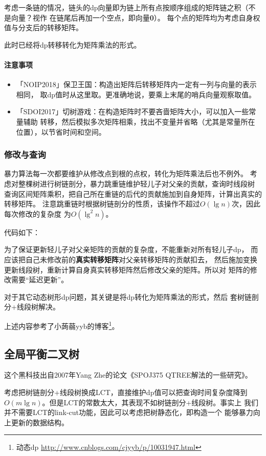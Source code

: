 考虑一条链的情况，链头的dp向量即为链上所有点按顺序组成的矩阵链之积（不是向量？视作
在链尾后再加一个空点，即向量{\bfseries 0}）。
每个点的矩阵均为考虑自身权值与分支后的转移矩阵。

此时已经将dp转移转化为矩阵乘法的形式。

\paragraph{注意事项}
\begin{itemize}
    \item 「NOIP2018」保卫王国：构造出矩阵后转移矩阵内一定有一列与向量的表示相同，
    取dp值时从这里取。更准确地说，要乘上末尾的哨兵向量观察取值。
    \item 「SDOI2017」切树游戏：在构造矩阵时不要吝啬矩阵大小，可以加入一些常量辅助
    转移，然后模拟多次矩阵相乘，找出不变量并省略（尤其是常量所在位置），以节省时间和空间。
\end{itemize}

\subsubsection{修改与查询}
暴力算法每一次都要维护从修改点到根的点权，转化为矩阵乘法后也不例外。
考虑对整棵树进行树链剖分，暴力跳重链维护轻儿子对父亲的贡献，查询时线段树
查询区间矩阵乘积，把自己所在重链的后代的贡献施加到自身矩阵，计算出真实的转移矩阵。
注意跳重链时根据树链剖分的性质，该操作不超过$O(\lg n)$次，因此每次修改的复杂度
为$O(\lg^2 n)$。

代码如下：


为了保证更新轻儿子对父亲矩阵的贡献的复杂度，不能重新对所有轻儿子dp，
而应该把自己未修改前的{\bfseries 真实转移矩阵}对父亲转移矩阵的贡献扣去，
然后施加变换更新线段树，重新计算自身真实转移矩阵然后修改父亲的矩阵。所以对
矩阵的修改需要``延迟更新''。

对于其它动态树形dp问题，其关键是将dp转化为矩阵乘法的形式，然后
套树链剖分+线段树解决。

上述内容参考了小蒟蒻yyb的博客\footnote{
    动态dp
    \url{http://www.cnblogs.com/cjyyb/p/10031947.html}
}。
\subsection{全局平衡二叉树}
这个黑科技出自2007年Yang Zhe的论文《SPOJ375 QTREE解法的一些研究》\cite{GBT}。

考虑把树链剖分+线段树换成LCT，直接维护dp值可以把查询时间复杂度降到
$O(m\lg n)$。但是LCT的常数太大，其表现不如树链剖分+线段树。事实上
我们并不需要LCT的link-cut功能，因此可以考虑把树静态化，即构造一个
能够暴力向上更新的数据结构。

